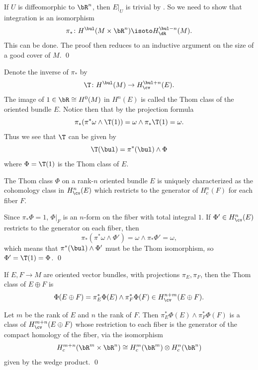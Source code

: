    If $U$ is diffeomorphic to $\bR^n$, then $E|_U$ is trivial by .
    So we need to show that integration is an isomorphism
    $$ \pi_*\colon H^\bul(M\times\bR^n) \isoto H^{\bul-n}_\dR(M) . $$
    This can be done.
    The proof then reduces to an inductive argument on the size of a good cover of $M$.
    \qed

\eproof

Denote the inverse of $\pi_*$ by
$$ \T\colon H^\bul(M) \to H^{\bul+n}_\cv(E) . $$
The image of $1\in\bR\cong H^0(M)$ in $H^n(E)$ is called the {\emphcolor Thom class} of the oriented bundle $E$.
Notice then that by the projection formula
$$ \pi_*(\pi^*\omega\wedge\T(1)) = \omega\wedge\pi_*\T(1) = \omega . $$
Thus we see that $\T$ can be given by
$$ \T(\bul) = \pi^*(\bul)\wedge\Phi $$
where $\Phi=\T(1)$ is the Thom class of $E$.

\bprop

    The Thom class $\Phi$ on a rank-$n$ oriented bundle $E$ is uniquely characterized as the cohomology class in $H^n_\cv(E)$ which restricts
    to the generator of $H^n_c(F)$ for each fiber $F$.

\eprop

\bproof

    Since $\pi_*\Phi=1$, $\Phi|_F$ is an $n$-form on the fiber with total integral $1$.
    If $\Phi'\in H^n_\cv(E)$ restricts to the generator on each fiber, then
    $$ \pi_*(\pi^*\omega\wedge\Phi') = \omega\wedge\pi_*\Phi' = \omega , $$
    which means that $\pi^*(\bul)\wedge\Phi'$ must be the Thom isomorphism, so $\Phi'=\T(1)=\Phi$.
    \qed

\eproof

\bprop

    If $E,F\to M$ are oriented vector bundles, with projections $\pi_E,\pi_F$, then the Thom class of $E\oplus F$ is
    $$ \Phi(E\oplus F) = \pi_E^*\Phi(E)\wedge\pi_F^*\Phi(F) \in H^{n+m}_\cv(E\oplus F) . $$

\eprop

\bproof

    Let $m$ be the rank of $E$ and $n$ the rank of $F$.
    Then $\pi_E^*\Phi(E)\wedge\pi_F^*\Phi(F)$ is a class of $H^{m+n}_\cv(E\oplus F)$ whose restriction to each fiber is
    the generator of the compact homology of the fiber, via the isomorphism
    $$ H^{m+n}_c(\bR^m\times\bR^n) \cong H^m_c(\bR^m)\otimes H^n_c(\bR^n) $$
    given by the wedge product.
    \qed

\eproof

